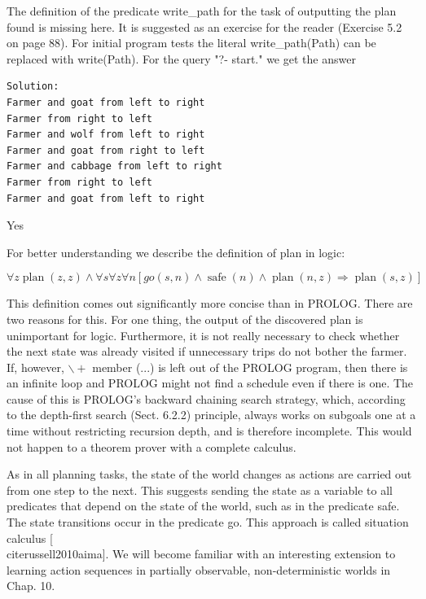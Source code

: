\documentclass[10pt]{book}
\begin{document}
The definition of the predicate write\_path for the task of outputting the plan found is missing here. It is suggested as an exercise for the reader (Exercise 5.2 on page 88). For initial program tests the literal write\_path(Path) can be replaced with write(Path). For the query "?- start." we get the answer

\begin{verbatim}
Solution:
Farmer and goat from left to right
Farmer from right to left
Farmer and wolf from left to right
Farmer and goat from right to left
Farmer and cabbage from left to right
Farmer from right to left
Farmer and goat from left to right
\end{verbatim}

Yes

For better understanding we describe the definition of plan in logic:

$$
\forall z \operatorname{plan}(z, z) \wedge \forall s \forall z \forall n[g o(s, n) \wedge \operatorname{safe}(n) \wedge \operatorname{plan}(n, z) \Rightarrow \operatorname{plan}(s, z)]
$$

This definition comes out significantly more concise than in PROLOG. There are two reasons for this. For one thing, the output of the discovered plan is unimportant for logic. Furthermore, it is not really necessary to check whether the next state was already visited if unnecessary trips do not bother the farmer. If, however, $\backslash+$ member (...) is left out of the PROLOG program, then there is an infinite loop and PROLOG might not find a schedule even if there is one. The cause of this is PROLOG's backward chaining search strategy, which, according to the depth-first search (Sect. 6.2.2) principle, always works on subgoals one at a time without restricting recursion depth, and is therefore incomplete. This would not happen to a theorem prover with a complete calculus.

As in all planning tasks, the state of the world changes as actions are carried out from one step to the next. This suggests sending the state as a variable to all predicates that depend on the state of the world, such as in the predicate safe. The state transitions occur in the predicate go. This approach is called situation calculus [\\cite{russell2010aima}]. We will become familiar with an interesting extension to learning action sequences in partially observable, non-deterministic worlds in Chap. 10.
\end{document}
